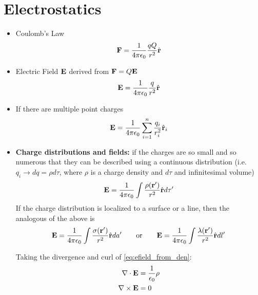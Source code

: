 \documentclass[oneside,a4paper,11pt]{report}
\begin{document}
\section{Electrostatics}
\begin{itemize}

\item Coulomb's Law
\begin{equation}
\mathbf{F} = \frac{1}{4 \pi \epsilon_0} \frac{q Q}{r^2} \hat{\mathbf{r}}
\end{equation}

\item Electric Field $\mathbf{E}$ derived from $\mathbf{F} = Q\mathbf{E}$
\begin{equation}
\mathbf{E} = \frac{1}{4 \pi \epsilon_0} \frac{q}{r^2} \hat{\mathbf{r}}
\end{equation}

\item If there are multiple point charges
\begin{equation}
\mathbf{E} = \frac{1}{4 \pi \epsilon_0} \sum_{i=1}^{n} \frac{q_i}{r_i^2} \hat{\mathbf{r}}_i
\end{equation}

\item \textbf{Charge distributions and fields:} if the charges are so small and so numerous that they can be described using a continuous distribution (i.e.\@ $q_i \to dq = \rho d\tau$, where $\rho$ is a charge density and $d\tau$ and infinitesimal volume)
\begin{equation}
\mathbf{E} = \frac{1}{4 \pi \epsilon_0} \int \frac{\rho(\mathbf{r}')}{r^2} \hat{\mathbf{r}} d\tau' \label{eq:efield_from_den}
\end{equation}
If the charge distribution is localized to a surface or a line, then the analogous of the above is
\begin{equation}
    \mathbf{E} = \frac{1}{4 \pi \epsilon_0} \int \frac{\sigma(\mathbf{r}')}{r^2} \hat{\mathbf{r}} da' \qquad \text{or} \qquad \mathbf{E} = \frac{1}{4 \pi \epsilon_0} \int \frac{\lambda(\mathbf{r}')}{r^2} \hat{\mathbf{r}} dl'
\end{equation}

Taking the divergence and curl of \cref{eq:efield_from_den}:
\begin{align}
\nabla \cdot \mathbf{E} &= \frac{1}{\epsilon_0} \rho \\
\nabla \times \mathbf{E} &= 0
\end{align}


\end{itemize}
\end{document}

